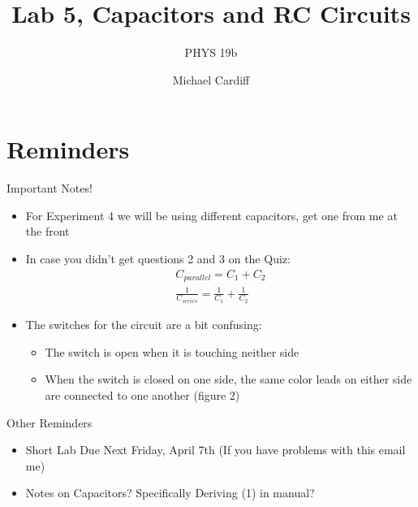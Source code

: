 \documentclass{beamer}
\title{Lab 5, Capacitors and RC Circuits}
\author{Michael Cardiff}
\subtitle{PHYS 19b}
\begin{document}
\begin{frame}
  \titlepage{}
\end{frame}

\section{Reminders}
\begin{frame}{Important Notes!}
  \begin{itemize}
  \item For Experiment 4 we will be using different capacitors, get one from me at the front
  \item In case you didn't get questions 2 and 3 on the Quiz:
    \begin{align*}
     C_{parallel}=C_1+C_2\\
     \frac1{C_{series}}=\frac1{C_1}+\frac1{C_2}
    \end{align*}
  \item The switches for the circuit are a bit confusing:
    \begin{itemize}
    \item The switch is open when it is touching neither side
    \item When the switch is closed on one side, the same color leads on either side are connected to one another (figure 2)
    \end{itemize}
  \end{itemize}
\end{frame}

\begin{frame}{Other Reminders}
  \begin{itemize}
  \item Short Lab Due Next Friday, April 7th (If you have problems with this email me)
  \item Notes on Capacitors? Specifically Deriving (1) in manual?
  \end{itemize}
\end{frame}
\end{document}
